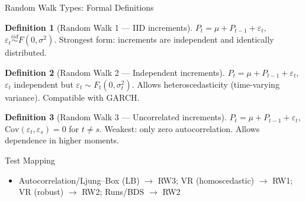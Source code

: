 \documentclass[9pt, aspectratio=169, t]{beamer}
\theoremstyle{definition}
\newtheorem{defn}{Definition}
\newenvironment{cminipage}[1]{%
    \par\noindent\hfill\begin{minipage}{#1}\ignorespaces
}{%
    \end{minipage}\hfill\null\par
}
\newcommand{\Cov}{\text{Cov}}
\begin{document}
\begin{frame}{Random Walk Types: Formal Definitions}
\begin{cminipage}{0.95\textwidth}
\footnotesize
\begin{defn}[Random Walk 1 --- IID increments]
$P_t = \mu + P_{t-1} + \varepsilon_t$, \; $\varepsilon_t \stackrel{iid}{\sim} F(0, \sigma^2)$. \;
Strongest form: increments are independent and identically distributed.
\end{defn}
\vspace{-1mm}
\begin{defn}[Random Walk 2 --- Independent increments]
$P_t = \mu + P_{t-1} + \varepsilon_t$, \; $\varepsilon_t$ independent but $\varepsilon_t \sim F_t(0, \sigma_t^2)$. \;
Allows heteroscedasticity (time-varying variance). Compatible with GARCH.
\end{defn}
\vspace{-1mm}
\begin{defn}[Random Walk 3 --- Uncorrelated increments]
$P_t = \mu + P_{t-1} + \varepsilon_t$, \; $\Cov(\varepsilon_t, \varepsilon_s) = 0$ for $t \neq s$. \;
Weakest: only zero autocorrelation. Allows dependence in higher moments.
\end{defn}
\vspace{-1mm}
\begin{alertblock}{Test Mapping}
\begin{itemize}\setlength{\itemsep}{0pt}
    \item Autocorrelation/Ljung--Box (LB) $\to$ RW3; \; VR (homoscedastic) $\to$ RW1; \; VR (robust) $\to$ RW2; \; Runs/BDS $\to$ RW2
\end{itemize}
\end{alertblock}
\end{cminipage}
\end{frame}
\end{document}

